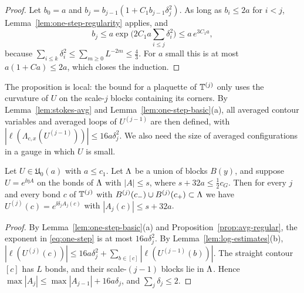 \begin{proof}
Let $b_0=a$ and $b_j=b_{j-1}(1+C_1b_{j-1}\delta_j^2)$. As long as $b_{i}\le2a$ for $i<j$, Lemma~\ref{lem:one-step-regularity} applies, and
\[
b_j\le a\exp\Big(2C_1a\sum_{i\le j}\delta_i^2\Big)\le a\,e^{3C_1a},
\]
because $\sum_{i\le k}\delta_i^2\le\sum_{m\ge0}L^{-2m}\le\frac43$. For $a$ small this is at most $a(1+Ca)\le2a$, which closes the induction.
\end{proof}

The proposition is local: the bound for a plaquette of $\mathbb T^{(j)}$ only uses the curvature of $U$ on the scale-$j$ blocks containing its corners. By Lemma~\ref{lem:stokes-avg} and Lemma~\ref{lem:one-step-basic}(a), all averaged contour variables and averaged loops of $U^{(j-1)}$ are then defined, with $|\ell(\Lambda_{c,x}(U^{(j-1)}))|\le16a\delta_j^2$. We also need the size of averaged configurations in a gauge in which $U$ is small.

\begin{lemma}\label{lem:avg-local-gauge}
Let $U\in\mathfrak U_0(a)$ with $a\le c_1$. Let $\Lambda$ be a union of blocks $B(y)$, and suppose $U=e^{\ii\eta A}$ on the bonds of $\Lambda$ with $|A|\le s$, where $s+32a\le\frac12c_G$. Then for every $j$ and every bond $c$ of $\mathbb T^{(j)}$ with $B^{(j)}(c_-)\cup B^{(j)}(c_+)\subset\Lambda$ we have $U^{(j)}(c)=e^{\ii\delta_jA_j(c)}$ with $|A_j(c)|\le s+32a$.
\end{lemma}

\begin{proof}
By Lemma~\ref{lem:one-step-basic}(a) and Proposition~\ref{prop:avg-regular}, the exponent in \eqref{eq:one-step} is at most $16a\delta_j^2$. By Lemma~\ref{lem:log-estimates}(b), $|\ell(U^{(j)}(c))|\le16a\delta_j^2+\sum_{b\in[c]}|\ell(U^{(j-1)}(b))|$. The straight contour $[c]$ has $L$ bonds, and their scale-$(j-1)$ blocks lie in $\Lambda$. Hence $\max|A_j|\le\max|A_{j-1}|+16a\delta_j$, and $\sum_j\delta_j\le2$.
\end{proof}

